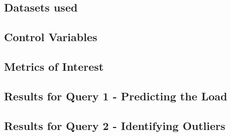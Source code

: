 \subsection{Datasets used}
\subsection{Control Variables}
\subsection{Metrics of Interest}

\subsection{Results for Query 1 - Predicting the Load}
\subsection{Results for Query 2 - Identifying Outliers}